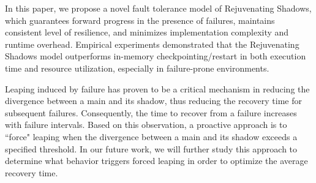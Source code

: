 
In this paper, we propose a novel fault tolerance model of Rejuvenating Shadows, which guarantees forward progress in the presence of failures, maintains consistent level of resilience, and minimizes implementation complexity and runtime overhead. Empirical experiments demonstrated that the Rejuvenating Shadows model outperforms in-memory checkpointing/restart in both execution time and resource utilization, especially in failure-prone environments.

Leaping induced by failure has proven to be a critical mechanism in reducing the divergence between a main and its shadow, 
thus reducing the recovery time for subsequent failures. Consequently, the time to recover from a failure increases with failure intervals.  
Based on this observation, a proactive approach is to ``force" leaping when the divergence between a main and its shadow exceeds a specified threshold. 
In our future work, we will further study this approach to determine what behavior triggers forced leaping in order to optimize the average recovery time. 





